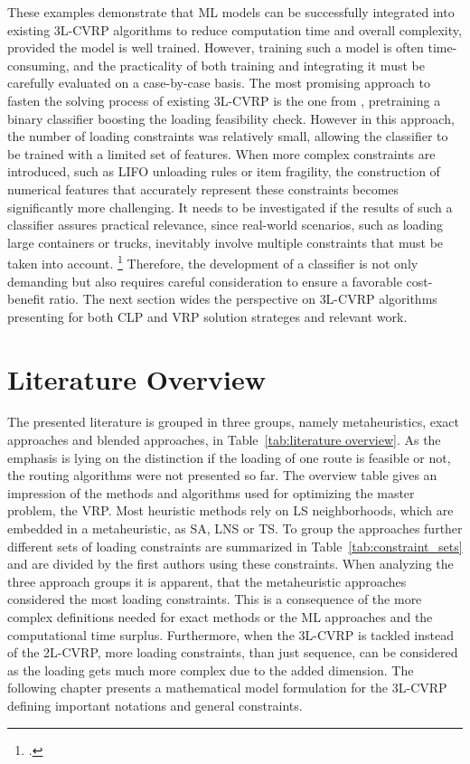 \parbreak

These examples demonstrate that \gls{ML} models can be successfully integrated into existing \gls{3L-CVRP}
algorithms to reduce computation time and overall complexity, provided the model is well trained.
However, training such a model is often time-consuming, and the practicality of both training and
integrating it must be carefully evaluated on a case-by-case basis. The most promising approach to
fasten the solving process of existing \gls{3L-CVRP} is the one from \cite{zhang_learning-based_2022},
pretraining a binary classifier boosting the loading feasibility check. However in this approach,
the number of loading constraints was relatively small, allowing the classifier
to be trained with a limited set of features. When more complex constraints are introduced, such as
\gls{LIFO} unloading rules or item fragility, the construction of numerical features that accurately
represent these constraints becomes significantly more challenging. It needs to be investigated if
the results of such a classifier assures practical relevance, since real-world
scenarios, such as loading large containers or trucks, inevitably involve multiple constraints that
must be taken into account. \footcite[cf.][pp. 1--2]{bischoff_issues_1995}
Therefore, the development of a classifier is not only demanding but also
requires careful consideration to ensure a favorable cost-benefit ratio. The next section wides the perspective
on \gls{3L-CVRP} algorithms presenting for both \gls{CLP} and \gls{VRP} solution strateges and relevant work.

\section{Literature Overview}
The presented literature is grouped in three groups, namely metaheuristics, exact approaches and blended
approaches, in Table~\ref{tab:literature overview}. As the emphasis is lying on the distinction
if the loading of one route is feasible or not, the routing algorithms were not presented so far.
The overview table gives an impression of the methods and algorithms used for
optimizing the master problem, the \gls{VRP}. Most heuristic methods rely on \gls{LS} neighborhoods,
which are embedded in a metaheuristic, as \gls{SA}, \gls{LNS} or \gls{TS}. To group the approaches
further different sets of loading constraints are summarized in Table~\ref{tab:constraint_sets} and
are divided by the first authors using these constraints.
When analyzing the three approach groups it is apparent, that the metaheuristic approaches considered
the most loading constraints. This is a consequence of the more complex definitions needed for
exact methods or the \gls{ML} approaches and the computational time surplus. Furthermore, when
the \gls{3L-CVRP} is tackled instead of the \gls{2L-CVRP}, more loading constraints, than just sequence,
can be considered as the loading gets much more complex due to the added dimension. The following chapter
presents a mathematical model formulation for the \gls{3L-CVRP} defining important notations and general
constraints.


